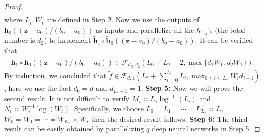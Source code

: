 \documentclass[11pt, preprint]{imsart}
\numberwithin{equation}{section}
\def \mcF{\mathcal{F}}
\def \bfz{\mathbf{z}}
\def \bfh{\mathbf{h}}
\theoremstyle{plain}
\theoremstyle{definition}
\begin{document}
\begin{proof}
\begin{eqnarray*}
\end{eqnarray*}
where $L_i, W_i$ are defined in Step 2.
Now we use the outputs of $\widetilde{\bfh}_0((\bfz-a_0)/(b_0-a_0))$ as inputs and  parallelize all the $\widetilde{h}_{1,j}$'s (the total number is $d_2$) to implement $\widetilde{\bfh}_1\circ\widetilde{\bfh}_0((\bfz-a_0)/(b_0-a_0))$. It can be verified that
\begin{eqnarray*}
\widetilde{\bfh}_1\circ\widetilde{\bfh}_0((\bfz-a_0)/(b_0-a_0))\in \mcF_{d_0, d_2}(L_0+L_1+2, \max\{d_1W_0, d_2W_1\}).
\end{eqnarray*}
By induction, we concluded that $\widetilde{f} \in \mcF_{d, 1}(L_*+\sum_{i=0}^{L_*}L_i, \max_{0\leq i \leq L_*}W_id_{i+1})$, here we use the fact $d_0=d$ and $d_{L_*+1}=1$. 
\newline
\noindent\textbf{Step 5:} Now we will prove the second result. It is not difficult to verify $M_i\asymp L_i\log^{-1}(L_i)$ and $N_i\asymp W_i^{-1}\log(W_i)$.  Specifically, we choose $L_0=L_1=\cdots=L_{L_*}\asymp L$, $W_0=W_1=\cdots=W_{L_*}\asymp W$, then  the desired result follows.
\newline
\noindent\textbf{Step 6:}  The third result can be easily obtained by parallelizing $q$ deep neural networks in Step 5.
\end{proof}
\end{document}

